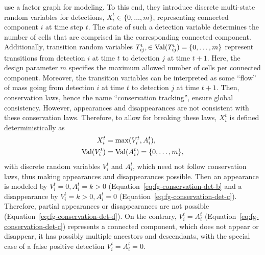 \citet{schiegg_13_conservation} use a factor graph for modeling. To this end, they introduce
discrete multi-state random variables for detections, $X_i^t \in \{0,\dots ,m\}$,
representing connected component $i$ at time step $t$. The state of such a detection variable
determines the number of cells that are comprised in the corresponding connected
component. Additionally, transition random variables $T_{ij}^t, \in \operatorname{Val}(T_{ij}^t)=\{0,\dots ,m\}$
represent transitions from detection $i$ at time $t$ to detection $j$ at time $t+1$. Here, the
design parameter $m$ specifies the maximum allowed number of cells per connected
component. Moreover, the transition variables can be interpreted as some ``flow'' of mass going from
detection $i$ at time $t$ to detection $j$ at time $t+1$. Then, conservation laws, hence the name
``conservation tracking'', ensure global consistency. However, appearances and disappearances are
not consistent with these conservation laws. Therefore, to allow for breaking these laws, $X_i^t$
is defined deterministically as
\begin{align}
    \label{eq:cons-det-a-v}
    X_i^t& = \max(V_i^t, A_i^t), \\
    \operatorname{Val}(V_i^t) &= \operatorname{Val}(A_i^t) = \{0,\dots ,m\},
\end{align}
with discrete random variables $V_i^t$ and $A_i^t$, which need not follow conservation laws, thus
making appearances and disappearances possible. Then an appearance is modeled by $V_i^t=0,
A_i^t=k>0$ (Equation~\ref{eq:fg-conservation-det-b} and a disappearance by $V_i^t=k>0, A_i^t=0$
(Equation~\ref{eq:fg-conservation-det-c}). Therefore, partial appearances or disappearances are not
possible (Equation~\ref{eq:fg-conservation-det-d}). On the contrary, $V_i^t=A_i^t$
(Equation~\ref{eq:fg-conservation-det-c}) represents a connected component, which does not appear or
disappear, \ie it has possibly multiple ancestors and descendants, with the special case of a false
positive detection $V_i^t=A_i^t=0$.

